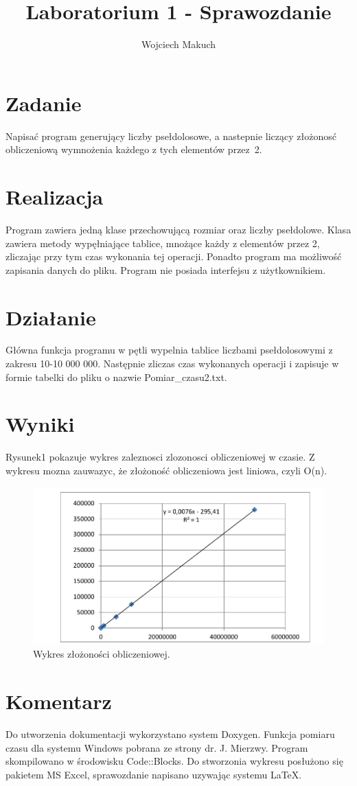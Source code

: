 

\author{Wojciech Makuch}
\title{Laboratorium 1 - Sprawozdanie}


	\maketitle
	\section{Zadanie}
			Napisać program generujący liczby psełdolosowe, a nastepnie liczący złożonosć obliczeniową wymnożenia każdego z tych elementów przez~2.
		\section{Realizacja}
		Program zawiera jedną klase przechowującą rozmiar oraz liczby psełdolowe. Klasa zawiera metody wypęłniające tablice, mnożące każdy z elementów przez 2, zliczając przy tym czas wykonania tej operacji. Ponadto program ma możliwość zapisania danych do pliku. Program nie posiada interfejsu z użytkownikiem.
		\section{Działanie}
		Główna funkcja programu w pętli wypelnia tablice liczbami psełdolosowymi z zakresu 10-10 000 000. Następnie zliczas czas wykonanych operacji i zapisuje w formie tabelki do pliku o nazwie Pomiar\_czasu2.txt.
		\section{Wyniki}
		Rysunek1 pokazuje wykres zaleznosci zlozonosci obliczeniowej w czasie. Z wykresu mozna zauwazyc, że złożoność obliczeniowa jest liniowa, czyli O(n).
		 \begin{figure}
	 	\centering
	 	\includegraphics[width=14cm]{Wykres1.pdf}
	 	\caption{Wykres złożoności obliczeniowej.}
		 \end{figure}
		\section{Komentarz}
		Do utworzenia dokumentacji wykorzystano system Doxygen.
		Funkcja pomiaru czasu dla systemu Windows pobrana ze strony dr. J. Mierzwy. Program skompilowano w środowisku Code::Blocks. Do stworzonia wykresu posłużono się pakietem MS Excel, sprawozdanie napisano uzywając systemu \LaTeX.
